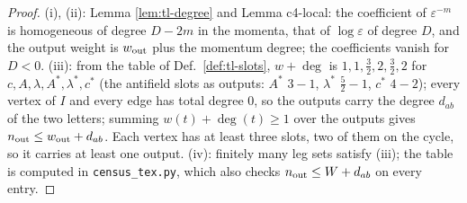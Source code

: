 \documentclass[11pt]{article}
\numberwithin{equation}{section}
\theoremstyle{plain}
\theoremstyle{definition}
\begin{document}
\begin{proof}
(i), (ii): Lemma \ref{lem:tl-degree} and Lemma c4-local: the coefficient of $\varepsilon^{-m}$ is homogeneous of degree $D-2m$ in the momenta, that of $\log\varepsilon$ of degree $D$, and the output weight is $w_{\rm out}$ plus the momentum degree; the coefficients vanish for $D<0$. (iii): from the table of Def.~\ref{def:tl-slots}, $w+\deg$ is $1,1,\tfrac32,2,\tfrac32,2$ for $c,A,\lambda,A^*,\lambda^*,c^*$ (the antifield slots as outputs: $A^*$ $3-1$, $\lambda^*$ $\tfrac52-1$, $c^*$ $4-2$); every vertex of $I$ and every edge has total degree $0$, so the outputs carry the degree $d_{ab}$ of the two letters; summing $w(t)+\deg(t)\ge1$ over the outputs gives $n_{\rm out}\le w_{\rm out}+d_{ab}$. Each vertex has at least three slots, two of them on the cycle, so it carries at least one output. (iv): finitely many leg sets satisfy (iii); the table is computed in \texttt{census\_tex.py}, which also checks $n_{\rm out}\le W+d_{ab}$ on every entry.
\end{proof}
\end{document}
